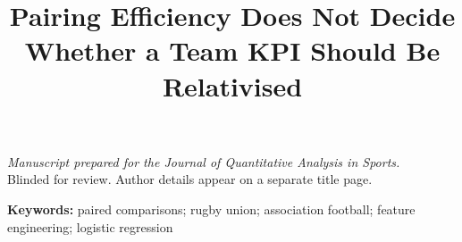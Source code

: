 \documentclass[12pt,letterpaper]{article}
\title{Pairing Efficiency Does Not Decide Whether a Team KPI Should Be Relativised}
\author{}
\date{}
\newif\ifjqasincludesi
\begin{document}
\maketitle

\begin{center}
\textit{Manuscript prepared for the Journal of Quantitative Analysis in Sports.}\\
Blinded for review. Author details appear on a separate title page.
\end{center}

\begin{abstract}
\jqasabstractbody
\end{abstract}

\noindent\textbf{Keywords:} paired comparisons; rugby union; association football; feature engineering; logistic regression










\printbibliography[title={References}]

\ifjqasincludesi

\fi
\end{document}
